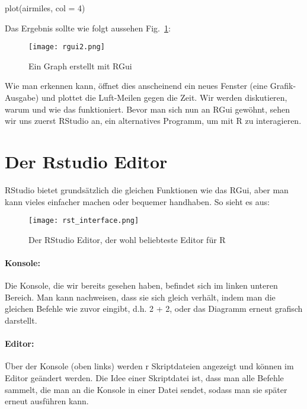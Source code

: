 \documentclass[a4paper,twoside]{tufte-book}\usepackage[]{graphicx}\usepackage[]{color}
\begin{document}
\begin{appendices}
\begin{Schunk}
\begin{Sinput}
plot(airmiles, col = 4)
\end{Sinput}
\end{Schunk}

Das Ergebnis sollte wie folgt aussehen Fig.~\ref{fig: Rgui2}:

\begin{figure}[]
\begin{center}
\texttt{[image: rgui2.png]}
\caption{Ein Graph erstellt mit RGui}
\label{fig: Rgui2}
\end{center}
\end{figure}

Wie man erkennen kann, öffnet dies anscheinend ein neues Fenster (eine Grafik-Ausgabe) und plottet die Luft-Meilen gegen die Zeit. Wir werden diskutieren, warum und wie das funktioniert. Bevor man sich nun an RGui gewöhnt, sehen wir uns zuerst RStudio an, ein alternatives Programm, um mit R zu interagieren.

\section{Der Rstudio Editor}
 
RStudio bietet grundsätzlich die gleichen Funktionen wie das RGui, aber man kann vieles einfacher machen oder bequemer handhaben. So sieht es aus:

\begin{figure}[]
\begin{center}
\texttt{[image: rst\_interface.png]}
\caption{Der RStudio Editor, der wohl beliebteste Editor für R}
\label{fig: Rstudio}
\end{center}
\end{figure}


\paragraph{Konsole:} Die Konsole, die wir bereits gesehen haben, befindet sich im linken unteren Bereich. Man kann nachweisen, dass sie sich gleich verhält, indem man die gleichen Befehle wie zuvor eingibt, d.h. 2 + 2, oder das Diagramm erneut grafisch darstellt.

\paragraph{Editor:} Über der Konsole (oben links) werden r Skriptdateien angezeigt und können im Editor geändert werden. Die Idee einer Skriptdatei ist, dass man alle Befehle sammelt, die man an die Konsole in einer Datei sendet, sodass man sie später erneut ausführen kann.  


\end{appendices}
\end{document}
